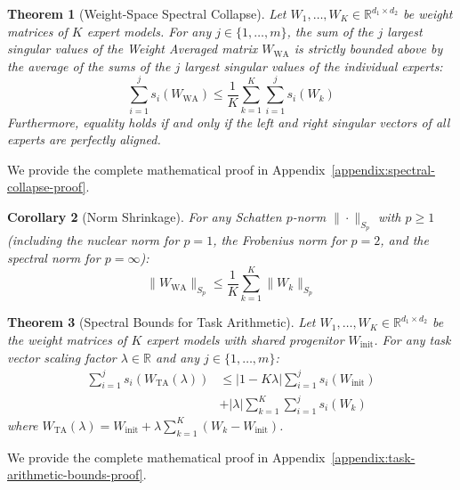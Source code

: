 \documentclass{article}
\theoremstyle{plain}
\newtheorem{theorem}{Theorem}[section]
\newtheorem{corollary}[theorem]{Corollary}
\theoremstyle{definition}
\theoremstyle{remark}
\begin{document}
\begin{theorem}[Weight-Space Spectral Collapse]
\label{thm:spectral-collapse}
Let $W_1, \dots, W_K \in \mathbb{R}^{d_1 \times d_2}$ be weight matrices of $K$ expert models. For any $j \in \{1, \dots, m\}$, the sum of the $j$ largest singular values of the Weight Averaged matrix $W_{\text{WA}}$ is strictly bounded above by the average of the sums of the $j$ largest singular values of the individual experts:
\begin{equation}
    \sum_{i=1}^j s_i(W_{\text{WA}}) \le \frac{1}{K} \sum_{k=1}^K \sum_{i=1}^j s_i(W_k)
\end{equation}
Furthermore, equality holds if and only if the left and right singular vectors of all experts are perfectly aligned.
\end{theorem}

We provide the complete mathematical proof in Appendix~\ref{appendix:spectral-collapse-proof}.

\begin{corollary}[Norm Shrinkage]
For any Schatten $p$-norm $\|\cdot\|_{S_p}$ with $p \ge 1$ (including the nuclear norm for $p=1$, the Frobenius norm for $p=2$, and the spectral norm for $p=\infty$):
\begin{equation}
    \|W_{\text{WA}}\|_{S_p} \le \frac{1}{K} \sum_{k=1}^K \|W_k\|_{S_p}
\end{equation}
\end{corollary}

\begin{theorem}[Spectral Bounds for Task Arithmetic]
\label{thm:task-arithmetic-bounds}
Let $W_1, \dots, W_K \in \mathbb{R}^{d_1 \times d_2}$ be the weight matrices of $K$ expert models with shared progenitor $W_{\text{init}}$. For any task vector scaling factor $\lambda \in \mathbb{R}$ and any $j \in \{1, \dots, m\}$:
\begin{equation}
\begin{split}
    \sum_{i=1}^j s_i(W_{\text{TA}}(\lambda)) &\le |1 - K\lambda| \sum_{i=1}^j s_i(W_{\text{init}}) \\
    &+ |\lambda| \sum_{k=1}^K \sum_{i=1}^j s_i(W_k)
\end{split}
\end{equation}
where $W_{\text{TA}}(\lambda) = W_{\text{init}} + \lambda \sum_{k=1}^K (W_k - W_{\text{init}})$.
\end{theorem}

We provide the complete mathematical proof in Appendix~\ref{appendix:task-arithmetic-bounds-proof}.
\end{document}
